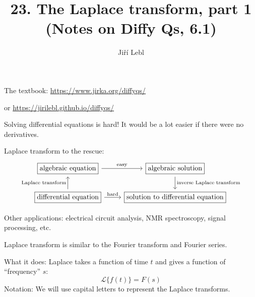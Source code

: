 \documentclass[10pt,aspectratio=169]{beamer}
\author{Ji\v{r}\'i Lebl}
\institute[OSU]{%
Oklahoma State University%
}
\title{23. The Laplace transform, part 1\\(Notes on Diffy Qs, 6.1)}
\date{}
\begin{document}
\begin{frame}
\titlepage


\begin{center}
The textbook: \url{https://www.jirka.org/diffyqs/}

or \url{https://jirilebl.github.io/diffyqs/}
\end{center}
\end{frame}

\begin{frame}
Solving differential equations is hard!
It would be a lot easier if there were no derivatives.

\medskip
\pause

Laplace transform to the rescue:
\[
\begin{tikzcd}[ampersand replacement=\&]
\boxed{\text{algebraic equation}} \arrow[r, "\text{easy}"] \&
\boxed{\text{algebraic solution}} \arrow[d, "\text{inverse Laplace transform}"] \\
\boxed{\text{differential equation}}
\arrow[r, "\text{hard}"] \arrow[u, "\text{Laplace transform}"] \&
\boxed{\text{solution to differential equation}}
\end{tikzcd}
\]

\pause

Other applications: electrical circuit analysis, NMR
spectroscopy, signal processing, etc.

\medskip
\pause

Laplace transform is similar to the Fourier transform and Fourier series.

\medskip
\pause

What it does: Laplace takes a function of time $t$ and gives a function of
``frequency'' $s$:
\[
\mathcal{L} \bigl\{ f(t) \bigr\} = F(s)
\]
\pause
Notation: We will use capital letters to represent the Laplace transforms.

\end{frame}
\end{document}
